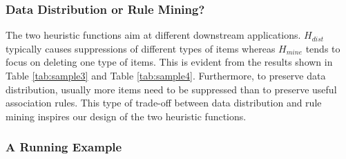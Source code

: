 \subsubsection{Data Distribution or Rule Mining?}
The two heuristic functions aim at different downstream applications.
$H_{dist}$ typically causes suppressions of different types of items whereas
$H_{mine}$ tends to focus on deleting one type of items. This is evident
from the results shown in Table \ref{tab:sample3} and Table \ref{tab:sample4}.
Furthermore, to preserve data distribution, usually more items need to be
suppressed than to preserve useful association rules.
This type of trade-off between data distribution and rule mining inspires
our design of the two heuristic functions.

\subsubsection{A Running Example}
\label{sec:appendix}

\begin{table}
\caption{Sensitive Rules in the Running Example}
\centering
{}
\end{table}


